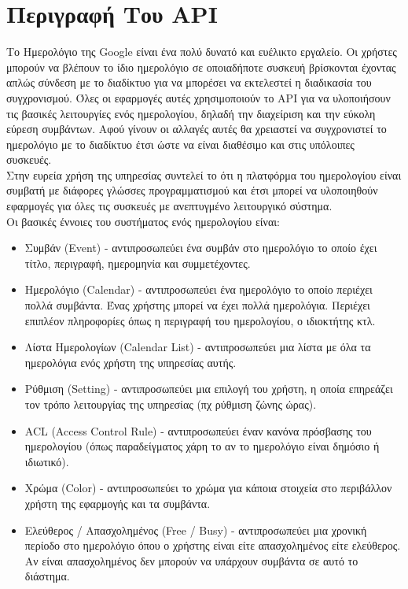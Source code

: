 \documentclass[12pt]{article}
\begin{document}
\section {Περιγραφή Του API}
Το Ημερολόγιο της Google είναι ένα πολύ δυνατό και ευέλικτο εργαλείο. Οι χρήστες μπορούν να βλέπουν το ίδιο ημερολόγιο σε οποιαδήποτε συσκευή βρίσκονται έχοντας απλώς σύνδεση με το διαδίκτυο για να μπορέσει να εκτελεστεί η διαδικασία του συγχρονισμού. Όλες οι εφαρμογές αυτές χρησιμοποιούν το API για να υλοποιήσουν τις βασικές λειτουργίες ενός ημερολογίου, δηλαδή την διαχείριση και την εύκολη εύρεση συμβάντων. Αφού γίνουν οι αλλαγές αυτές θα χρειαστεί να συγχρονιστεί το ημερολόγιο με το διαδίκτυο έτσι ώστε να είναι διαθέσιμο και στις υπόλοιπες συσκευές. 
\\[0.3cm]
Στην ευρεία χρήση της υπηρεσίας συντελεί το ότι η πλατφόρμα του ημερολογίου είναι συμβατή με διάφορες γλώσσες προγραμματισμού και έτσι μπορεί να υλοποιηθούν εφαρμογές για όλες τις συσκευές με ανεπτυγμένο λειτουργικό σύστημα.
\\[0.3cm]
Οι βασικές έννοιες του συστήματος ενός ημερολογίου είναι:

\begin{itemize}
\item Συμβάν (Event) - αντιπροσωπεύει ένα συμβάν στο ημερολόγιο το οποίο έχει τίτλο, περιγραφή, 
ημερομηνία και συμμετέχοντες. 

\item Ημερολόγιο (Calendar) - αντιπροσωπεύει ένα ημερολόγιο το οποίο περιέχει πολλά συμβάντα. Ένας χρήστης μπορεί να έχει πολλά ημερολόγια. Περιέχει επιπλέον πληροφορίες όπως η περιγραφή του ημερολογίου, ο ιδιοκτήτης κτλ.

\item Λίστα Ημερολογίων (Calendar List) - αντιπροσωπεύει μια λίστα με όλα τα ημερολόγια ενός χρήστη της υπηρεσίας αυτής.

\item Ρύθμιση (Setting) - αντιπροσωπεύει μια επιλογή του χρήστη, η οποία επηρεάζει τον τρόπο λειτουργίας της υπηρεσίας (πχ ρύθμιση ζώνης ώρας).

\item ACL (Access Control Rule) - αντιπροσωπεύει έναν κανόνα πρόσβασης του ημερολογίου (όπως παραδείγματος χάρη το αν το ημερολόγιο είναι δημόσιο ή ιδιωτικό).

\item Χρώμα (Color) - αντιπροσωπεύει το χρώμα για κάποια στοιχεία στο περιβάλλον χρήστη της εφαρμογής και τα συμβάντα.

\item Ελεύθερος / Απασχολημένος (Free / Busy) - αντιπροσωπεύει μια χρονική περίοδο στο ημερολόγιο όπου ο χρήστης είναι είτε απασχολημένος είτε ελεύθερος. Αν είναι απασχολημένος δεν μπορούν να υπάρχουν συμβάντα σε αυτό το διάστημα.
\end{itemize}
\end{document}
